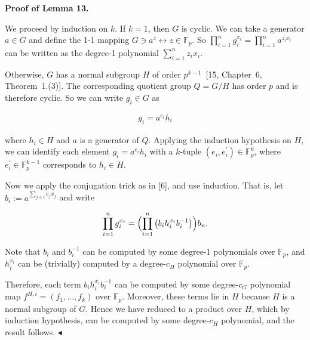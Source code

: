 


\par\medskip\noindent\textbf{Proof of Lemma 13.}\par




We proceed by induction on $k$.
If $k=1$, then $G$ is cyclic.
We can take a generator $a\in G$ and define the 1-1 mapping $G\ni a^{z}\leftrightarrow z\in\mathbb{F}_{p}$.
So $\prod_{i=1}^{n}g_{i}^{x_{i}}=\prod_{i=1}^{n}a^{z_{i}x_{i}}$ can be written as the degree-1 polynomial $\sum_{i=1}^{n}z_{i}x_{i}$.\par




Otherwise, $G$ has a normal subgroup $H$ of order
$p^{k-1}$ [15, Chapter 6, Theorem 1.(3)]. The corresponding
quotient group $Q=G/H$ has order $p$ and is therefore cyclic.
So we can write $g_{i}\in G$ as\par


\[\begin{gathered}
g_{i}=a^{e_{i}}h_{i}
\end{gathered}\]


where $h_{i}\in H$ and $a$ is a generator of $Q$.
Applying the induction hypothesis on $H$, we can identify each element $g_{i}=a^{e_{i}}h_{i}$ with a $k$-tuple $(e_{i},e_{i}^{\prime})\in\mathbb{F}_{p}^{k}$, where $e_{i}^{\prime}\in\mathbb{F}_{p}^{k-1}$ corresponds to $h_{i}\in H$.\par




Now we apply the conjugation trick as in [6], and use induction. That is, let $b_{i}:=a^{\sum_{j\leq i}e_{j}x_{j}}$ and write\par


\[\begin{gathered}
\prod_{i=1}^{n}g_{i}^{x_{i}}=\Bigl{(}\prod_{i=1}^{n}\left(b_{i}h_{i}^{x_{i}}b_{i}^{-1}\right)\Bigr{)}b_{n}.
\end{gathered}\]


Note that $b_{i}$ and $b_{i}^{-1}$ can be computed by some degree-1 polynomials over $\mathbb{F}_{p}$, and $h_{i}^{x_{i}}$ can be (trivially) computed by a degree-$c_{H}$ polynomial over $\mathbb{F}_{p}$.\par




Therefore, each term $b_{i}h_{i}^{x_{i}}b_{i}^{-1}$ can be computed by some degree-$c_{G}$ polynomial map $f^{H,i}=(f_{1},\ldots,f_{k})$ over $\mathbb{F}_{p}$.
Moreover, these terms lie in $H$ because $H$ is a normal subgroup of $G$. Hence we have reduced to a product over
$H$, which by induction hypothesis, can be computed by some degree-$c_{H}$ polynomial, and the result follows.
$\blacktriangleleft$\par




